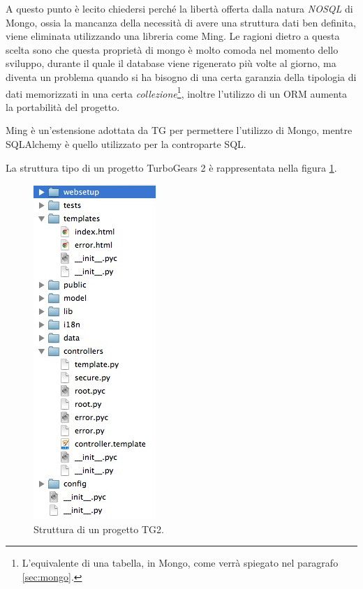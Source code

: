 A questo punto è lecito chiedersi perché la libertà offerta dalla natura \emph{NOSQL} di Mongo, ossia la mancanza della necessità di avere una struttura dati ben definita, viene eliminata utilizzando una libreria come Ming. Le ragioni dietro a questa scelta sono che questa proprietà di mongo è molto comoda nel momento dello sviluppo, durante il quale il database viene rigenerato più volte al giorno, ma diventa un problema quando si ha bisogno di una certa garanzia della tipologia di dati memorizzati in una certa \emph{collezione}\footnote{L'equivalente di una tabella, in Mongo, come verrà spiegato nel paragrafo \ref{sec:mongo}.}, inoltre l'utilizzo di un ORM aumenta la portabilità del progetto.

Ming è un'estensione adottata da TG per permettere l'utilizzo di Mongo, mentre SQLAlchemy è quello utilizzato per la controparte SQL.

La struttura tipo di un progetto TurboGears 2 è rappresentata nella figura \ref{fig:progetto}.
\begin{figure}[ht!]
	\label{fig:progetto}
	\centering
	\includegraphics{img/tg2project.jpg}
	\caption{Struttura di un progetto TG2.}
\end{figure}

